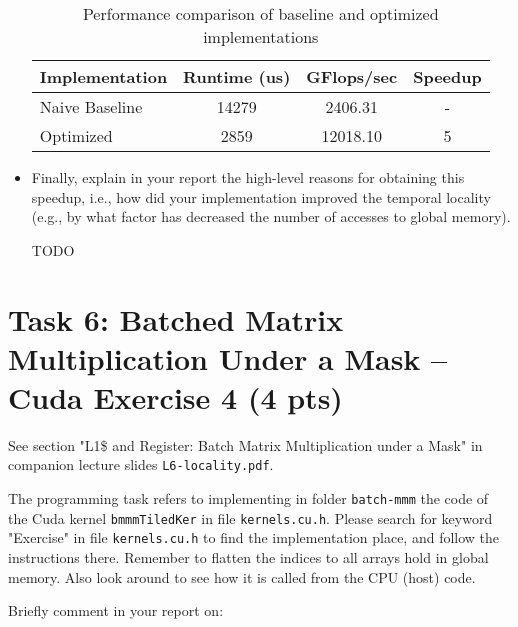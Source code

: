 \documentclass{article}
\begin{document}
\begin{itemize}
    
    \begin{table}[h]
        \centering
        \begin{tabular}{|l|c|c|c|}
        \hline
        \textbf{Implementation} & \textbf{Runtime (us)} & \textbf{GFlops/sec} & \textbf{Speedup} \\
        \hline
        Naive Baseline & 14279 & 2406.31 & -\\
        Optimized & 2859 & 12018.10 & 5 \\
        \hline
        \end{tabular}
        \caption{Performance comparison of baseline and optimized implementations}
        \label{tab:performance-comparison}
    \end{table}

    \item Finally, explain in your report the high-level reasons for obtaining
    this speedup, i.e., how did your implementation improved the temporal
    locality (e.g., by what factor has decreased the number of accesses to
    global memory).

    TODO
\end{itemize}

\section{Task 6: Batched Matrix Multiplication Under a Mask -- Cuda Exercise 4 (4 pts)}

See section "L1\$ and Register: Batch Matrix Multiplication under a Mask" in companion lecture slides \texttt{L6-locality.pdf}.

The programming task refers to implementing in folder \texttt{batch-mmm} the code of the Cuda kernel \texttt{bmmmTiledKer} in file \texttt{kernels.cu.h}. Please search for keyword "Exercise" in file \texttt{kernels.cu.h} to find the implementation place, and follow the instructions there. Remember to flatten the indices to all arrays hold in global memory. Also look around to see how it is called from the CPU (host) code.

Briefly comment in your report on:
\end{document}
